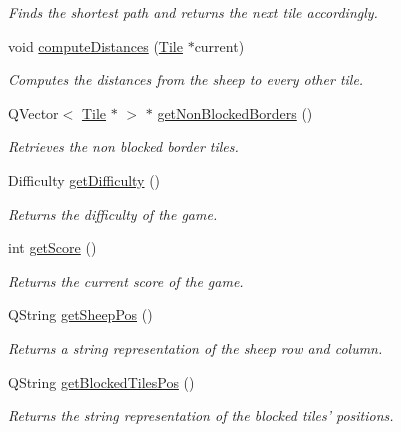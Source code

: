 \begin{DoxyCompactItemize}
\begin{DoxyCompactList}\small\item\em \-Finds the shortest path and returns the next tile accordingly. \end{DoxyCompactList}\item 
\hypertarget{classGame2Scene_a02a6d6e7aef7ec61f76788b206240af9}{void \hyperlink{classGame2Scene_a02a6d6e7aef7ec61f76788b206240af9}{compute\-Distances} (\hyperlink{classTile}{\-Tile} $\ast$current)}\label{classGame2Scene_a02a6d6e7aef7ec61f76788b206240af9}

\begin{DoxyCompactList}\small\item\em \-Computes the distances from the sheep to every other tile. \end{DoxyCompactList}\item 
\-Q\-Vector$<$ \hyperlink{classTile}{\-Tile} $\ast$ $>$ $\ast$ \hyperlink{classGame2Scene_aa7fe6cf089b0f2339558f1ad787d001d}{get\-Non\-Blocked\-Borders} ()
\begin{DoxyCompactList}\small\item\em \-Retrieves the non blocked border tiles. \end{DoxyCompactList}\item 
\-Difficulty \hyperlink{classGame2Scene_a15661ca51aa6bf5616e92d308675713d}{get\-Difficulty} ()
\begin{DoxyCompactList}\small\item\em \-Returns the difficulty of the game. \end{DoxyCompactList}\item 
int \hyperlink{classGame2Scene_a1e4e9a28a8210c1c047fb6543e01ff6c}{get\-Score} ()
\begin{DoxyCompactList}\small\item\em \-Returns the current score of the game. \end{DoxyCompactList}\item 
\-Q\-String \hyperlink{classGame2Scene_aa4c646f84bfa02a4daf7960d3852e169}{get\-Sheep\-Pos} ()
\begin{DoxyCompactList}\small\item\em \-Returns a string representation of the sheep row and column. \end{DoxyCompactList}\item 
\-Q\-String \hyperlink{classGame2Scene_aa75b286f0690b5fe64e0e2760a3fd50f}{get\-Blocked\-Tiles\-Pos} ()
\begin{DoxyCompactList}\small\item\em \-Returns the string representation of the blocked tiles' positions. \end{DoxyCompactList}\item 

\end{DoxyCompactItemize}
